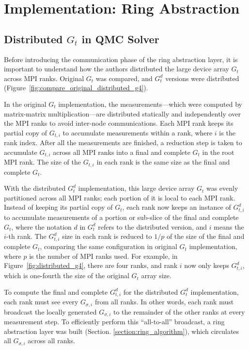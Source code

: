 \section{Implementation: Ring Abstraction}
\label{sec:implement}
\subsection{Distributed \mbox{$G_t$} in QMC Solver}
\label{distributedG4}
Before introducing the communication phase of the ring abstraction layer,
it is important to understand how the authors distributed the large device array $G_t$ across MPI ranks.
%
Original $G_t$ was compared, and $G^d_t$ versions were distributed
(Figure~\ref{fig:compare_original_distributed_g4}). 


In the original $G_t$ implementation, the measurements---which were computed by matrix-matrix multiplication---are distributed statically and independently over the MPI ranks to avoid
inter-node communications. Each MPI rank keeps its partial copy of $G_{t,i}$ to accumulate 
measurements within a rank, where $i$ is the rank index. 
After all the measurements are finished, a reduction step is 
taken to accumulate $G_{t,i}$ across all MPI ranks into a final and complete
$G_t$ in the root MPI rank. The size of the $G_{t,i}$ in each rank is 
the same size as the final and complete $G_t$. 

With the distributed $G^d_t$ implementation, this large device array 
$G_t$ was evenly partitioned across all MPI ranks; each portion of it is local to each MPI rank.
%
Instead of keeping its partial copy of $G_t$, 
each rank now keeps an instance of $G^d_{t,i}$ to accumulate measurements 
of a portion or sub-slice of the final and complete $G_t$, where the notation
$d$ in $G^d_t$  refers to the distributed version, and $i$ means the $i$-th rank.
%
The $G^d_{t,i}$ size in each rank is 
reduced to $1/p$ of the size of the final and complete $G_t$, comparing the same configuration 
in original $G_t$ implementation, where $p$ is the number of MPI ranks used. 
%
For example, in Figure~\ref{fig:distributed_g4}, there are four ranks, and rank $i$
now only keeps $G^d_{t,i}$, which is one-fourth the size of the original $G_t$ array size.

To compute the final and complete $G^d_{t,i}$ for the distributed $G^d_t$ implementation, 
each rank must see every $G_{\sigma,i}$ from all ranks. 
%
In other words, each rank must broadcast the
locally generated $G_{\sigma,i}$ to the remainder of the other ranks at every measurement step. 
%
To efficiently perform this ``all-to-all'' broadcast, a ring abstraction layer was built (Section. \ref{section:ring_algorithm}), which circulates
all $G_{\sigma,i}$ across all ranks.

